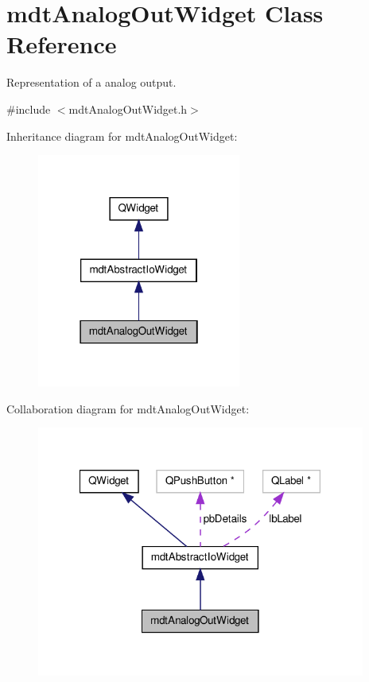 \hypertarget{classmdt_analog_out_widget}{\section{mdt\-Analog\-Out\-Widget Class Reference}
\label{classmdt_analog_out_widget}
}


Representation of a analog output.  




{\ttfamily \#include $<$mdt\-Analog\-Out\-Widget.\-h$>$}



Inheritance diagram for mdt\-Analog\-Out\-Widget\-:
\nopagebreak
\begin{figure}[H]
\begin{center}
\leavevmode
\includegraphics[width=190pt]{classmdt_analog_out_widget__inherit__graph}
\end{center}
\end{figure}


Collaboration diagram for mdt\-Analog\-Out\-Widget\-:
\nopagebreak
\begin{figure}[H]
\begin{center}
\leavevmode
\includegraphics[width=306pt]{classmdt_analog_out_widget__coll__graph}
\end{center}
\end{figure}
